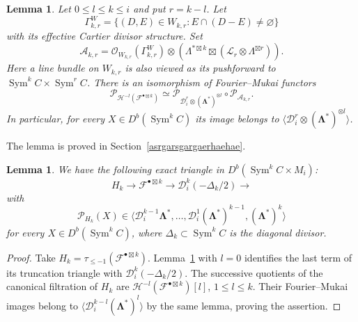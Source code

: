 \documentclass[11pt,letterpaper]{amsart}
\theoremstyle{plain}
\newtheorem{lemma}[theorem]{Lemma}
\theoremstyle{definition}
\theoremstyle{remark}
\numberwithin{equation}{section}
\DeclareMathOperator{\Sym}{Sym}
\begin{document}
\begin{lemma}\label{sRGwgwrG}
Let $0\le l\le k\le i$ and put $r=k-l$.
Let
$$
 \Gamma^W_{k,r}=\{(D,E)\in W_{k,r}:E\cap(D-E)\ne\varnothing\}
$$
with its effective Cartier divisor structure.
Set
\[
 \mathcal A_{k,r}=
 \mathcal O_{W_{k,r}}(\Gamma^W_{k,r})\otimes
 \left(\Lambda^{*\boxtimes k}\boxtimes
            (\mathscr L_r\otimes\Lambda^{\boxtimes r})\right).
\]
Here a line bundle on $W_{k,r}$ is also viewed as its pushforward to
$\Sym^kC\times\Sym^rC$.  There is an isomorphism of Fourier--Mukai
functors
\[
 \mathcal P_{\mathcal H^{-l}(\mathcal F^{\bullet\boxtimes k})}
 \simeq
 \mathcal P_{\mathcal D_i^r\otimes(\boldsymbol\Lambda^*)^{\otimes l}}
       \circ\mathcal P_{\mathcal A_{k,r}}.
\]
In particular, for every $X\in D^b(\Sym^kC)$ its image belongs to
$\langle\mathcal D_i^r\otimes(\boldsymbol\Lambda^*)^{\otimes l}\rangle$.
\end{lemma}

The lemma is proved in
Section~\ref{asrgarsgargaerhaehae}.
\begin{lemma}\label{sRHwrhjeRJAETJ}
We have the following  exact triangle in $D^b(\Sym^kC\times M_i)$:
\begin{equation}\label{adfbadfb}
 H_k\longrightarrow\mathcal F^{\bullet\boxtimes k}
 \longrightarrow\mathcal D_i^k(-\Delta_k/2)\longrightarrow
\end{equation}
with
\[
 \mathcal P_{H_k}(X)\in
 \bigl\langle
 \mathcal D_i^{k-1}\boldsymbol\Lambda^*,\ldots,
 \mathcal D_i^1(\boldsymbol\Lambda^*)^{k-1},
 (\boldsymbol\Lambda^*)^k
 \bigr\rangle
\]
for every $X\in D^b(\operatorname{Sym}^kC)$, where
$\Delta_k\subset\operatorname{Sym}^kC$ is the diagonal divisor.
\end{lemma}

\begin{proof}
Take $H_k=\tau_{\le-1}(\mathcal F^{\bullet\boxtimes k})$.
Lemma~\ref{sRGwgwrG} with $l=0$ identifies the last term of its
truncation triangle with $\mathcal D_i^k(-\Delta_k/2)$.
The successive quotients of the canonical filtration of $H_k$ are
$\mathcal H^{-l}(\mathcal F^{\bullet\boxtimes k})[l]$, $1\le l\le k$.
Their Fourier--Mukai images belong to
$\langle\mathcal D_i^{k-l}(\boldsymbol\Lambda^*)^l\rangle$
by the same lemma, proving the assertion.
\end{proof}
\end{document}
